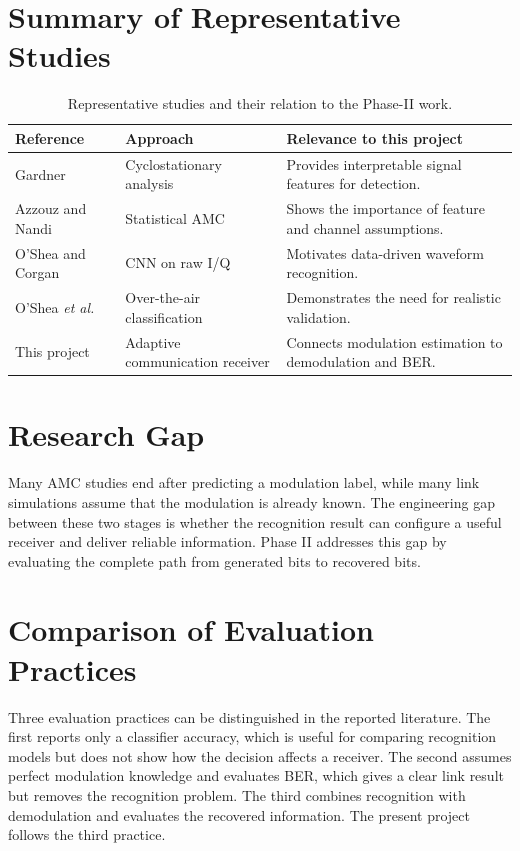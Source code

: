 \documentclass[12pt,twoside,openright]{report}
\begin{document}
\section{Summary of Representative Studies}
\begin{table}[htbp]
\centering
\small
\caption{Representative studies and their relation to the Phase-II work.}
\label{tab:literature}
\begin{tabular}{p{} p{} p{}}
\toprule
\textbf{Reference} & \textbf{Approach} & \textbf{Relevance to this project}\\
\midrule
Gardner~\cite{gardner1988} & Cyclostationary analysis &
Provides interpretable signal features for detection.\\
Azzouz and Nandi~\cite{azzouznandi1996} & Statistical AMC &
Shows the importance of feature and channel assumptions.\\
O'Shea and Corgan~\cite{oshea2016convolutional} & CNN on raw I/Q &
Motivates data-driven waveform recognition.\\
O'Shea \textit{et al.}~\cite{oshea2016generative} &
Over-the-air classification & Demonstrates the need for realistic validation.\\
This project & Adaptive communication receiver &
Connects modulation estimation to demodulation and BER.\\
\bottomrule
\end{tabular}
\end{table}

\section{Research Gap}
Many AMC studies end after predicting a modulation label, while many link
simulations assume that the modulation is already known. The engineering gap
between these two stages is whether the recognition result can configure a
useful receiver and deliver reliable information. Phase II addresses this gap
by evaluating the complete path from generated bits to recovered bits.

\section{Comparison of Evaluation Practices}
Three evaluation practices can be distinguished in the reported literature.
The first reports only a classifier accuracy, which is useful for comparing
recognition models but does not show how the decision affects a receiver. The
second assumes perfect modulation knowledge and evaluates BER, which gives a
clear link result but removes the recognition problem. The third combines
recognition with demodulation and evaluates the recovered information. The
present project follows the third practice.
\end{document}
